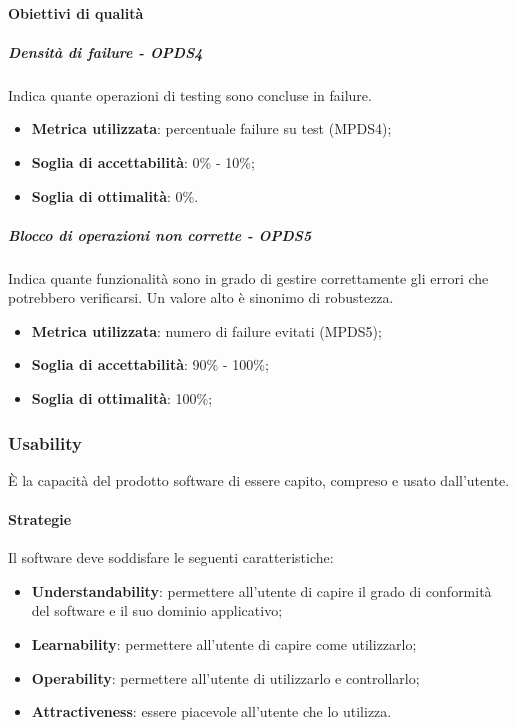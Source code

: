 \documentclass[PdQ.tex]{subfiles}
\begin{document}
			\paragraph{Obiettivi di qualità}
				\subparagraph{Densità di failure - OPDS4}
				Indica quante operazioni di testing sono concluse in failure.
				\begin{itemize}
					\item \textbf{Metrica utilizzata}: percentuale failure su test (MPDS4);
					\item \textbf{Soglia di accettabilità}: 0\% - 10\%;
					\item \textbf{Soglia di ottimalità}: 0\%.
				\end{itemize}
				
				\subparagraph{Blocco di operazioni non corrette - OPDS5}
				Indica quante funzionalità sono in grado di gestire correttamente gli errori che potrebbero verificarsi. Un valore alto è sinonimo di robustezza.
				\begin{itemize}
					\item \textbf{Metrica utilizzata}: numero di failure evitati (MPDS5);
					\item \textbf{Soglia di accettabilità}: 90\% - 100\%;
					\item \textbf{Soglia di ottimalità}: 100\%;
				\end{itemize}
		
		\subsubsection{Usability}
		È la capacità del prodotto software di essere capito, compreso e usato dall'utente.
		
			\paragraph{Strategie}
			Il software deve soddisfare le seguenti caratteristiche:
			\begin{itemize}
				\item \textbf{Understandability}: permettere all'utente di capire il grado di conformità del software e il suo dominio applicativo;
				\item \textbf{Learnability}: permettere all'utente di capire come utilizzarlo;
				\item \textbf{Operability}: permettere all'utente di utilizzarlo e controllarlo;
				\item \textbf{Attractiveness}: essere piacevole all'utente che lo utilizza.
			\end{itemize}
			
\end{document}

